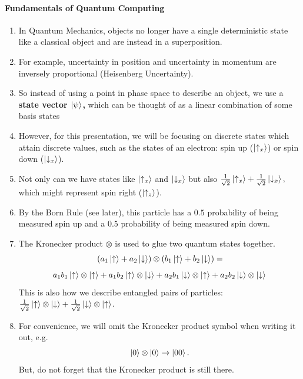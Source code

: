 \documentclass[12pt]{article}
\theoremstyle{remark}
\begin{document}
\paragraph{Fundamentals of Quantum Computing}
\begin{enumerate}
    \item In Quantum Mechanics, objects no longer have a single deterministic state like a classical object and are instead in a superposition.
    \item For example, uncertainty in position and uncertainty in momentum are inversely proportional (Heisenberg Uncertainty).
    \item So instead of using a point in phase space to describe an object, we use a \textbf{state vector $\ket{\psi}$,} which can be thought of as a linear combination of some basis states
    \item However, for this presentation, we will be focusing on discrete states which attain discrete values, such as the states of an electron: spin up ($\ket{\uparrow_x}$) or spin down ($\ket{\downarrow_x}$).
    \item Not only can we have states like $\ket{\uparrow_x}$ and $\ket{\downarrow_x}$ but also $\frac{1}{\sqrt{2}}\ket{\uparrow_x}+\frac{1}{\sqrt{2}}\ket{\downarrow_x},$ which might represent spin right ($\ket{\uparrow_{z}}$).
    \item By the Born Rule (see later), this particle has a $0.5$ probability of being measured spin up and a $0.5$ probability of being measured spin down.

    \item The Kronecker product $\otimes$ is used to glue two quantum states together.
    \[
    (a_1 \ket{\uparrow}+a_2\ket{\downarrow})\otimes(b_1 \ket{\uparrow}+b_2\ket{\downarrow}) =\]
    \[a_1 b_1 \ket{\uparrow}\otimes\ket{\uparrow}+a_1 b_2 \ket{\uparrow}\otimes\ket{\downarrow} + a_2 b_1 \ket \downarrow \otimes \ket \uparrow + a_2 b_2 \ket \downarrow \otimes \ket \downarrow \]
    This is also how we describe entangled pairs of particles: $\frac{1}{\sqrt 2}\ket{\uparrow}\otimes\ket \downarrow + \frac{1}{\sqrt 2} \ket \downarrow \otimes \ket \uparrow$.
    \item For convenience, we will omit the Kronecker product symbol when writing it out, e.g.
    \[\ket{0}\otimes\ket{0}\to\ket{00}.\] But, do not forget that the Kronecker product is still there.
\end{enumerate}
\end{document}

